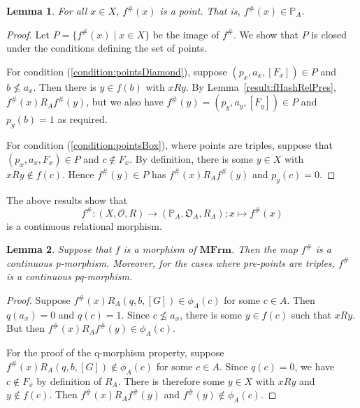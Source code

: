 \documentclass{article}[a4paper]
\newtheorem{lemma}{Lemma}%
\theoremstyle{definition}
\newcommand{\Ocal}{\mathcal{O}} %
\newcommand{\Ofrak}{\mathfrak{O}} %
\newcommand{\relsp}{\mathbf{RelSp}}
\newcommand{\mfrm}{\mathbf{MFrm}}
\newcommand{\Pbb}{\mathbb{P}}
\newcommand{\hash}{{\#}}
\begin{document}
\begin{lemma} 
\label{result:fHashGivesPoints}
For all $x \in X$, $f^{\#}(x)$ is a point. That is, $f^{\#}(x) \in \mathbb{P}_A$.
\end{lemma}

\begin{proof}
Let $P=\{ f^{\#} (x) \mid x \in X \}$ be the image of $f^{\#}$. We show that $P$ is closed under the conditions defining the set of points. 

For condition  (\ref{condition:pointsDiamond}), 
suppose $(p_x,a_x,[F_x]) \in P$ and $b \nleq a_x$. Then there is $y \in f(b)$ with $xRy$. 
By Lemma~\eqref{result:fHashRelPres}, 
$f^{\#}(x) R_A  f^{\#}(y)$, 
but we also have $f^{\#}(y) = (p_y,a_y,[F_y]) \in P$ and $p_y(b)=1$ as required.

For condition  (\ref{condition:pointsBox}), where points are triples, 
suppose that $(p_x,a_x,F_x) \in P$ and $c \notin F_x$. By definition, there is some $y \in X$ with $xRy \notin f(c)$.  Hence $f^{\#}(y) \in P$ has 
$f^{\#}(x) R_A f^{\#}(y)$ and $p_y(c)=0$.
\end{proof}

The above results show that 
\begin{equation*}
  f^\hash : (X , \Ocal , R) \longrightarrow ( \Pbb _A , \Ofrak _A , R_A) ; x \mapsto f^\hash (x) 
\end{equation*}
is a continuous relational morphism. 

\begin{lemma}
Suppose that $f$ is a morphism of $\mfrm$. Then the map $f^\hash$ is a continuous p-morphism. Moreover, for the cases where pre-points are triples, $f^\hash$ is a continuous pq-morphism.
\end{lemma}

\begin{proof}
    
    Suppose $f^\hash(x) R_A (q,b,[G]) \in \phi_A (c)$ for some $c \in A$. Then $q(a_x) = 0$ and $q(c)=1$. Since $c \nleq a_x$, there is some $y \in f(c)$ such that $xRy$. But then $f^\hash (x) R_A f^\hash (y) \in \phi _A (c)$. 

    For the proof of the q-morphism property, suppose $f^\hash(x) R_A (q,b,[G]) \notin \phi_A (c)$ for some $c \in A$. Since $q(c) = 0$, we have $c \notin F_x$ by definition of $R_A$.
    There is therefore some $y \in X$ with $xRy$ and $y \notin f(c)$. Then $f^{\#}(x) R_A f^{\#}(y)$ and $f^{\#} (y) \notin \phi _A (c)$.
\end{proof}
\end{document}

